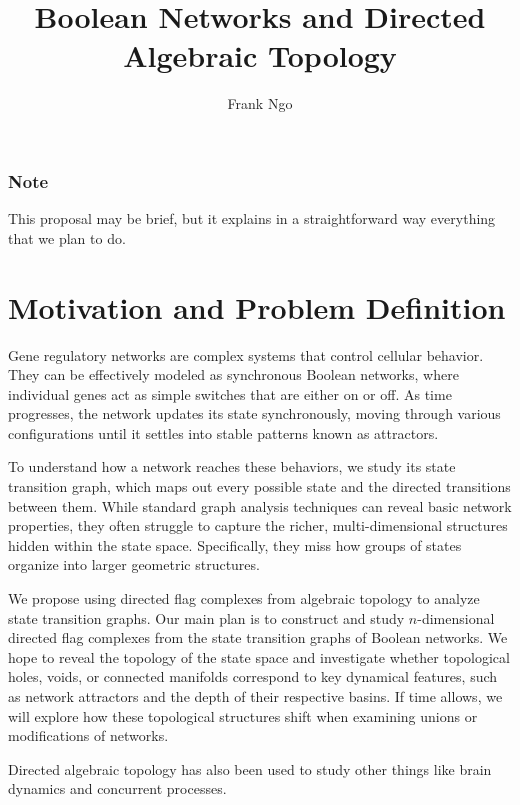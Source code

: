 \documentclass[sigconf]{acmart}
\begin{document}
\title{Boolean Networks and Directed Algebraic Topology}

\author{Frank Ngo}

\maketitle

\subsubsection*{Note}

This proposal may be brief, but it explains in a straightforward way everything that we plan to do.

\section{Motivation and Problem Definition}

Gene regulatory networks are complex systems that control cellular behavior. They can be effectively modeled as synchronous Boolean networks, where individual genes act as simple switches that are either on or off. 
As time progresses, the network updates its state synchronously, moving through various configurations until it settles into stable patterns known as attractors. 

To understand how a network reaches these behaviors, we study its state transition graph, which maps out every possible state and the directed transitions between them. 
While standard graph analysis techniques can reveal basic network properties, they often struggle to capture the richer, multi-dimensional structures hidden within the state space. 
Specifically, they miss how groups of states organize into larger geometric structures.

We propose using directed flag complexes from algebraic topology to analyze state transition graphs. 
Our main plan is to construct and study $n$-dimensional directed flag complexes from the state transition graphs of Boolean networks. 
We hope to reveal the topology of the state space and investigate whether topological holes, voids, or connected manifolds correspond to key dynamical features, such as network attractors and the depth of their respective basins. If time allows, we will explore how these topological structures shift when examining unions or modifications of networks.

Directed algebraic topology has also been used to study other things like brain dynamics and concurrent processes.
\end{document}
